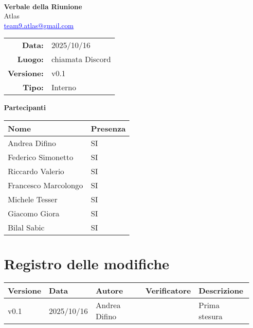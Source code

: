\documentclass[a4paper,12pt]{article}
\makeatletter
\newcommand{\Gruppo}{Atlas}
\newcommand{\Email}{\href{mailto:team9.atlas@gmail.com}{\textcolor{blue}{\underline{team9.atlas@gmail.com}}}}
\newcommand{\TitoloVerbale}{Verbale della Riunione}
\newcommand{\DataVerbale}{2025/10/16}
\newcommand{\LuogoVerbale}{chiamata Discord}
\newcommand{\LogoGruppo}{img/AtlasLogo.png} %
\newcommand{\VersioneVerbale}{v0.1} %
\newcommand{\VerbaleInterno}{Interno}
\makeatother
\begin{document}
\begin{titlepage}
    \centering

    \vspace*{0cm}
    \\
    [.5cm]
    {\Huge \textbf{\TitoloVerbale}}\\[0.8cm]
    {\LARGE \Gruppo}\\[0.1cm]
    {\Email}\\[1.2cm]

    \begin{tabular}{rl}
        \textbf{Data:} & \DataVerbale \\
        \textbf{Luogo:} & \LuogoVerbale \\
        \textbf{Versione:} & \VersioneVerbale \\
        \textbf{Tipo:} & \VerbaleInterno \\
    \end{tabular}

    \vspace{1.2cm}

    {\large \textbf{Partecipanti}}\\[0.5cm]
    \begin{tabular}{l|l}
        \textbf{Nome} & \textbf{Presenza} \\
        \hline
        Andrea Difino & SI \\
        Federico Simonetto & SI \\
        Riccardo Valerio & SI \\
        Francesco Marcolongo & SI \\
        Michele Tesser & SI \\
        Giacomo Giora & SI \\
        Bilal Sabic & SI \\
    \end{tabular}

\end{titlepage}

\section*{Registro delle modifiche}{
    \begin{center} 
        \begin{tabular}{|l|l|l|l|l|}
            \hline
            \textbf{Versione} & \textbf{Data} & \textbf{Autore} & \textbf{Verificatore} & \textbf{Descrizione} \\
            \hline
            \VersioneVerbale & \DataVerbale & Andrea Difino & & Prima stesura\\
            \hline
        \end{tabular}
    \end{center}
}
\end{document}
